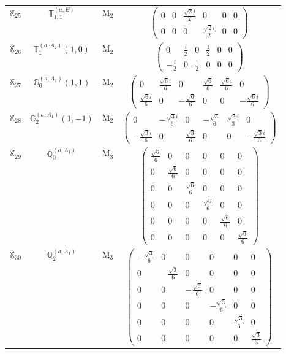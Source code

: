 \documentclass[fleqn,10pt,landscape]{article}
\begin{document}
\begin{itemize}
\begin{center}
\begin{longtable}{c|c|c|c}
$ \mathbb{X}_{25} $ & $\mathbb{T}_{1,1}^{(a,E)}$ & M$_{2}$ & $\begin{pmatrix} 0 & 0 & \frac{\sqrt{2} i}{2} & 0 & 0 & 0 \\ 0 & 0 & 0 & \frac{\sqrt{2} i}{2} & 0 & 0 \end{pmatrix}$ \\
$ \mathbb{X}_{26} $ & $\mathbb{T}_{1}^{(a,A_{2})}(1,0)$ & M$_{2}$ & $\begin{pmatrix} 0 & \frac{i}{2} & 0 & \frac{1}{2} & 0 & 0 \\ - \frac{i}{2} & 0 & \frac{1}{2} & 0 & 0 & 0 \end{pmatrix}$ \\
$ \mathbb{X}_{27} $ & $\mathbb{G}_{0}^{(a,A_{1})}(1,1)$ & M$_{2}$ & $\begin{pmatrix} 0 & \frac{\sqrt{6} i}{6} & 0 & \frac{\sqrt{6}}{6} & \frac{\sqrt{6} i}{6} & 0 \\ \frac{\sqrt{6} i}{6} & 0 & - \frac{\sqrt{6}}{6} & 0 & 0 & - \frac{\sqrt{6} i}{6} \end{pmatrix}$ \\
$ \mathbb{X}_{28} $ & $\mathbb{G}_{2}^{(a,A_{1})}(1,-1)$ & M$_{2}$ & $\begin{pmatrix} 0 & - \frac{\sqrt{3} i}{6} & 0 & - \frac{\sqrt{3}}{6} & \frac{\sqrt{3} i}{3} & 0 \\ - \frac{\sqrt{3} i}{6} & 0 & \frac{\sqrt{3}}{6} & 0 & 0 & - \frac{\sqrt{3} i}{3} \end{pmatrix}$ \\ \hline
$ \mathbb{X}_{29} $ & $\mathbb{Q}_{0}^{(a,A_{1})}$ & M$_{3}$ & $\begin{pmatrix} \frac{\sqrt{6}}{6} & 0 & 0 & 0 & 0 & 0 \\ 0 & \frac{\sqrt{6}}{6} & 0 & 0 & 0 & 0 \\ 0 & 0 & \frac{\sqrt{6}}{6} & 0 & 0 & 0 \\ 0 & 0 & 0 & \frac{\sqrt{6}}{6} & 0 & 0 \\ 0 & 0 & 0 & 0 & \frac{\sqrt{6}}{6} & 0 \\ 0 & 0 & 0 & 0 & 0 & \frac{\sqrt{6}}{6} \end{pmatrix}$ \\
$ \mathbb{X}_{30} $ & $\mathbb{Q}_{2}^{(a,A_{1})}$ & M$_{3}$ & $\begin{pmatrix} - \frac{\sqrt{3}}{6} & 0 & 0 & 0 & 0 & 0 \\ 0 & - \frac{\sqrt{3}}{6} & 0 & 0 & 0 & 0 \\ 0 & 0 & - \frac{\sqrt{3}}{6} & 0 & 0 & 0 \\ 0 & 0 & 0 & - \frac{\sqrt{3}}{6} & 0 & 0 \\ 0 & 0 & 0 & 0 & \frac{\sqrt{3}}{3} & 0 \\ 0 & 0 & 0 & 0 & 0 & \frac{\sqrt{3}}{3} \end{pmatrix}$ \\

\end{longtable}
\end{center}
\end{itemize}
\end{document}
